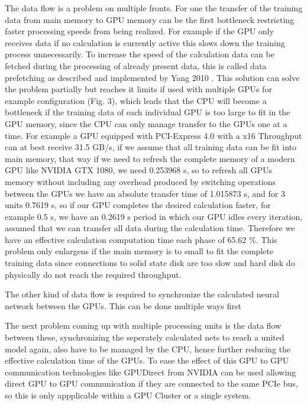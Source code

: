 \documentclass[conference]{IEEEtran}
\begin{document}
The data flow is a problem on multiple fronts. For one the transfer of the training data from main memory to GPU memory can be the first bottleneck restricting faster processing speeds from being realized. For example if the GPU only receives data if no calculation is currently active this slows down the training process unnecessarily. To increase the speed of the calculation data can be fetched during the processing of already present data, this is called data prefetching as described and implemented by Yang 2010 \cite{yang2010gpgpu}. This solution can solve the problem partially but reaches it limits if used with multiple GPUs for example configuration (Fig. 3), which leads that the CPU will become a bottleneck if the training data of each individual GPU is too large to fit in the GPU memory, since the CPU can only manage transfer to the GPUs one at a time. For example a GPU equipped with PCI-Express 4.0 with a x16 Throughput can at best receive 31.5 GB/s, if we assume that all training data can be fit into main memory, that way if we need to refresh the complete memory of a modern GPU like NVIDIA GTX 1080, we need 0.253968 s, so to refresh all GPUs memory without including any overhead produced by switching operations between the GPUs we have an absolute transfer time of 1.015873 s, and for 3 units 0.7619 s, so if our GPU completes the desired calculation faster, for example 0.5 s, we have an 0.2619 s period in which our GPU idles every iteration, assumed that we can transfer all data during the calculation time. Therefore we have an effective calculation computation time each phase of 65.62 \%. This problem only enlargens if the main memory is to small to fit the complete training data since connections to solid state disk are too slow and hard disk do physically do not reach the required throughput.

The other kind of data flow is required to synchronize the calculated neural network between the GPUs. This can be done multiple ways first 

The next problem coming up with multiple processing units is the data flow between these, synchronizing the seperately calculated nets to reach a united model again, also have to be managed by the CPU, hence further reducing the effective calculation time of the GPUs. To ease the effect of this GPU to GPU communication technologies like GPUDirect from NVIDIA\cite{nvidiagpudirect2017} can be used allowing direct GPU to GPU communication if they are connected to the same PCIe bus, so this is only appplicable within a GPU Cluster or a single system.
\end{document}
